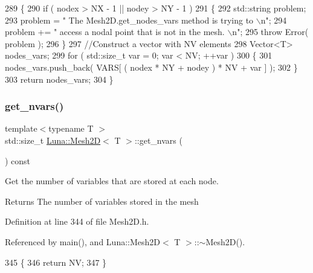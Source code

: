 \begin{DoxyCode}
289   \{
290     \textcolor{keywordflow}{if} ( nodex > NX - 1 || nodey > NY - 1 )
291     \{
292       std::string problem;
293       problem = \textcolor{stringliteral}{" The Mesh2D.get\_nodes\_vars method is trying to \(\backslash\)n"};
294       problem += \textcolor{stringliteral}{" access a nodal point that is not in the mesh. \(\backslash\)n"};
295       \textcolor{keywordflow}{throw} Error( problem );
296     \}
297     \textcolor{comment}{//Construct a vector with NV elements}
298     Vector<T> nodes\_vars;
299     \textcolor{keywordflow}{for} ( std::size\_t var = 0; var < NV; ++var )
300     \{
301       nodes\_vars.push\_back( VARS[ ( nodex * NY + nodey ) * NV + var ] );
302     \}
303     \textcolor{keywordflow}{return} nodes\_vars;
304   \}
\end{DoxyCode}
\mbox{\label{classLuna_1_1Mesh2D_a4ba86ff35a1f11cd245505cc6eea013e}} 
\subsubsection{\texorpdfstring{get\+\_\+nvars()}{get\_nvars()}}
{\footnotesize\ttfamily template$<$typename T $>$ \\
std\+::size\+\_\+t \hyperlink{classLuna_1_1Mesh2D}{Luna\+::\+Mesh2D}$<$ T $>$\+::get\+\_\+nvars (\begin{DoxyParamCaption}{ }\end{DoxyParamCaption}) const}



Get the number of variables that are stored at each node. 

\begin{DoxyReturn}{Returns}
The number of variables stored in the mesh 
\end{DoxyReturn}


Definition at line 344 of file Mesh2\+D.\+h.



Referenced by main(), and Luna\+::\+Mesh2\+D$<$ T $>$\+::$\sim$\+Mesh2\+D().


\begin{DoxyCode}
345   \{
346     \textcolor{keywordflow}{return} NV;
347   \}
\end{DoxyCode}
\mbox{\label{classLuna_1_1Mesh2D_a5a1fead4879bad7bd798cac3bfd10e85}} 
